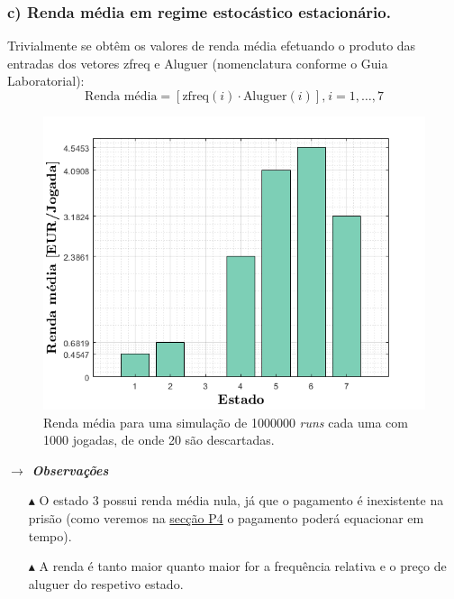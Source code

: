 \subsubsection{c) Renda média em regime estocástico estacionário.}
\label{subsubsec:P1c}

Trivialmente se obtêm os valores de renda média efetuando o produto das entradas dos vetores zfreq e Aluguer (nomenclatura conforme o Guia Laboratorial): 
$$ \text{Renda média} = \left[\text{zfreq}(i) \cdot \text{Aluguer}(i)\right]\text{,}\  i = 1, \dots, 7 $$

\vspace{-1em}
\begin{figure}[H]
    \centering
    \includegraphics[width = 0.55\linewidth]{img/P1/P1c.png}
    \caption{Renda média para uma simulação de 1000000 \textit{runs} cada uma com 1000 jogadas, de onde 20 são descartadas.}
    \label{fig:P1c}
\end{figure}

\noindent\textbf{\textit{$\rightarrow$ Observações}}
\begin{itemize}
    \item[$\blacktriangle$] O estado 3 possui renda média nula, já que o pagamento é inexistente na prisão (como veremos na \hyperref[subsec:P4]{secção P4} o pagamento poderá equacionar em tempo).
    \item[$\blacktriangle$] A renda é tanto maior quanto maior for a frequência relativa e o preço de aluguer do respetivo estado.
\end{itemize}

